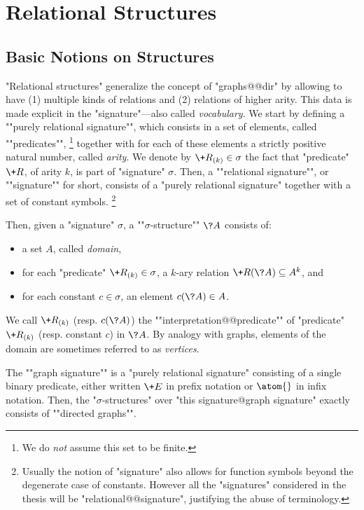 \section{Relational Structures}

\subsection{Basic Notions on Structures}

"Relational structures" generalize the concept of "graphs@@dir"
by allowing to have (1) multiple kinds of relations and
(2) relations of higher arity. This data is made explicit in
the "signature"---also called \emph{vocabulary}.
We start by defining a \AP""purely relational signature"", which consists
in a set of elements, called ""predicates"",%
\footnote{We do \emph{not} assume this set to be finite.}
together with for each
of these elements a strictly positive natural number, called \emph{arity}.
We denote by $\+R_{(k)} \in \sigma$ the fact that "predicate" $\+R$, of arity
$k$, is part of "signature" $\sigma$.
Then, a ""relational signature"", or ""signature"" for short, consists of a "purely relational 
signature" together with a set of constant symbols.%
\footnote{Usually the notion of "signature" also allows for function symbols beyond
the degenerate case of constants. However all the "signatures" considered in the thesis
will be "relational@@signature", justifying the abuse of terminology.}

Then, given a "signature" $\sigma$, a ""$\sigma$-structure"" $\?A$
consists of:
\begin{itemize}
	\item a set $A$, called \emph{domain},
	\item for each "predicate" $\+R_{(k)} \in \sigma$, a $k$-ary relation
		$\+R(\?A) \subseteq A^k$, and
	\item for each constant $c \in \sigma$, an element $c(\?A) \in A$.
\end{itemize}
We call $\+R_{(k)}$ (resp. $c(\?A)$) the \AP""interpretation@@predicate""
of "predicate" $\+R_{(k)}$ (resp. constant $c$) in $\?A$.
By analogy with graphs, elements of the domain are sometimes referred to as
\emph{vertices}.

The \AP""graph signature"" is a "purely relational signature"
consisting of a single binary predicate, either written $\+E$ in prefix notation
or $\atom{}$ in infix notation.
Then, the "$\sigma$-structures" over "this signature@graph signature"
exactly consists of \AP""directed graphs"".

